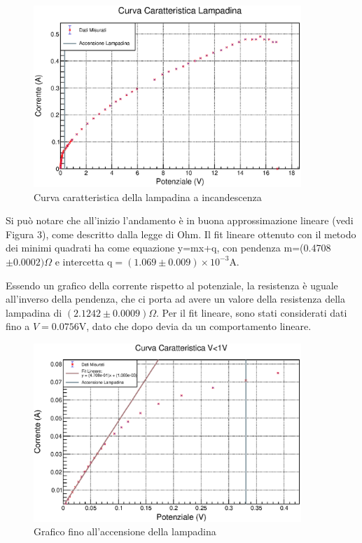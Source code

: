 \documentclass[a4paper]{article}
\begin{document}
\begin{figure}[!htbp] \label{fig2}
  \centering
      \includegraphics[width=0.9\textwidth]{immagini/bruciarelampa.eps}
        \caption{Curva caratteristica della lampadina a incandescenza}
\end{figure}
\FloatBarrier
Si può notare che all'inizio l'andamento è in buona approssimazione lineare (vedi Figura 3), come descritto dalla legge di Ohm. Il fit lineare ottenuto con il metodo dei minimi quadrati ha come equazione y=mx+q, con pendenza m=(0.4708$\pm 0.0002) \Omega$ e intercetta q$=(1.069\pm0.009)\times10^{-3}$A.

Essendo un grafico della corrente rispetto al potenziale, la resistenza è uguale all'inverso della pendenza, che ci porta ad avere un valore della resistenza della lampadina di $(2.1242\pm 0.0009) \Omega$. Per il fit lineare, sono stati considerati dati fino a $V=0.0756$V, dato che dopo devia da un comportamento lineare. 

\begin{figure}[!htbp]\label{fig3}
  \centering
      \includegraphics[width=0.9\textwidth]{immagini/graficozoomato1.eps}
        \caption{Grafico fino all'accensione della lampadina}
\end{figure}
\FloatBarrier
{}
\end{document}
